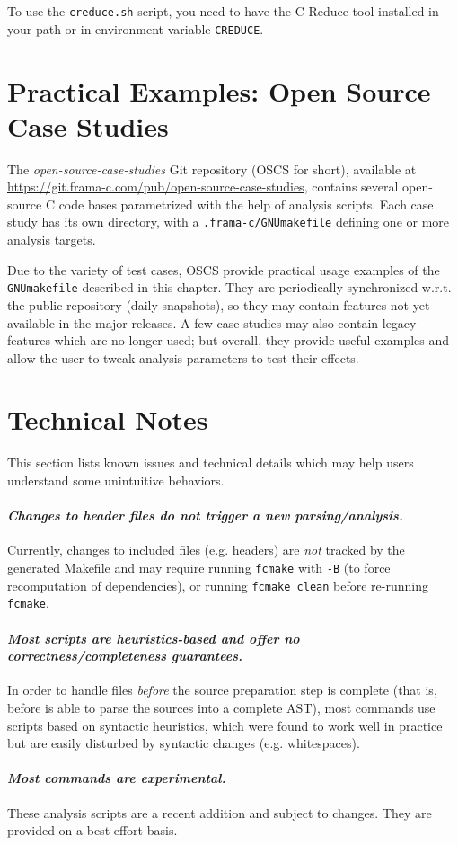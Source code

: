 To use the \texttt{creduce.sh} script, you need to have the C-Reduce tool
installed in your path or in environment variable \texttt{CREDUCE}.

\section{Practical Examples: Open Source Case Studies}

The {\em open-source-case-studies} Git repository (OSCS for short),
available at \url{https://git.frama-c.com/pub/open-source-case-studies},
contains several open-source C code bases parametrized with the help of
analysis scripts. Each case study has its own directory, with a
\texttt{.frama-c/GNUmakefile} defining one or more analysis targets.

Due to the variety of test cases, OSCS provide practical usage
examples of the \texttt{GNUmakefile} described in this chapter.
They are periodically synchronized w.r.t. the public \FramaC repository
(daily snapshots), so they may contain features not yet available in the
major \FramaC releases. A few case studies may also contain legacy features
which are no longer used; but overall, they provide useful examples and allow
the user to tweak analysis parameters to test their effects.

\section{Technical Notes}

This section lists known issues and technical details which may help users
understand some unintuitive behaviors.

\paragraph{\em Changes to header files do not trigger a new parsing/analysis.}
Currently, changes to included files (e.g. headers) are {\em not}
tracked by the generated Makefile and may require running \texttt{fcmake}
with \texttt{-B} (to force recomputation of dependencies), or running
\texttt{fcmake clean} before re-running \texttt{fcmake}.

\paragraph{\em Most scripts are heuristics-based and offer no
  correctness/completeness guarantees.} In order to handle files {\em before}
the source preparation step is complete (that is, before \FramaC is able to
parse the sources into a complete AST), most commands use scripts based on
syntactic heuristics, which were found to work well in practice but are
easily disturbed by syntactic changes (e.g. whitespaces).

\paragraph{\em Most commands are experimental.} These analysis scripts are a
recent addition and subject to changes. They are provided on a best-effort
basis.
